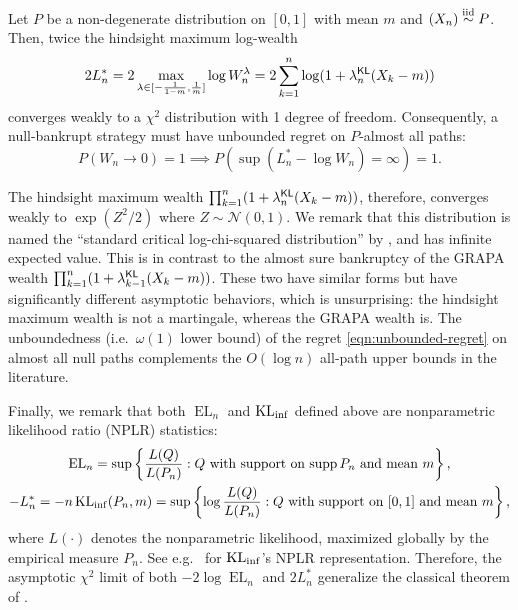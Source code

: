 \begin{theorem}\label{thm:chisq-klinf}  Let $P$ be a non-degenerate distribution on $[0,1]$ with mean $m$ and $(X_n)\overset{\mathrm{iid}}{\sim} P$. Then, twice the hindsight maximum log-wealth
    \begin{equation}
  2  L^*_n =  2\max_{\lambda \in [-\frac{1}{1-m}, \frac{1}{m}]} \log W_n^\lambda = 2\sum_{k=1}^n \log(1 + \lambda^{\mathsf{KL}}_n (X_k - m) )
    \end{equation}
    converges weakly to a $\chi^2$ distribution with 1 degree of freedom. 
    Consequently, a null-bankrupt strategy must have unbounded regret on $P$-almost all paths:
    \begin{equation}\label{eqn:unbounded-regret}
        P(W_n \to 0)=1 \implies P( \sup(L_n^* - \log W_n)=\infty) = 1.
    \end{equation}
\end{theorem}

The hindsight maximum wealth $\prod_{k=1}^n (1 + \lambda^{\mathsf{KL}}_n (X_k - m) )$, therefore, converges weakly to $\exp(Z^2/2)$ where $Z \sim \mathcal{N}(0,1)$. We remark that this distribution is named the ``standard critical log-chi-squared distribution'' by \citet[Proposition 5.7]{Wang2025ensm}, and has infinite expected value.
This is in contrast to the almost sure bankruptcy of the GRAPA wealth $\prod_{k=1}^n (1 + \lambda^{\mathsf{KL}}_{k-1} (X_k - m) )$. These two have similar forms but have significantly different asymptotic behaviors, which is unsurprising: the hindsight maximum wealth is not a martingale, whereas the GRAPA wealth is. The unboundedness (i.e.\ $\omega(1)$ lower bound) of the regret \eqref{eqn:unbounded-regret} on almost all null paths complements the $O(\log n)$ all-path upper bounds in the literature.


Finally, we remark that both $\operatorname{EL}_n$ and $\operatorname{KL}_{\inf}$ defined above are nonparametric likelihood ratio (NPLR) statistics:
\begin{gather}
    \operatorname{EL}_n = \sup \left\{ \frac{L(Q)}{L(P_n)} : \text{$Q$ with support on $\operatorname{supp}P_n$ and mean $m$} \right\},
    \\
 {-L_n^*}= {- n \operatorname{KL}_{\inf}(P_n, m)} = \sup  \left\{ \log \frac{L(Q)}{L(P_n)} : \text{$Q$ with support on $[0,1]$ and mean $m$} \right\},
\end{gather}
where $L(\cdot)$ denotes the nonparametric likelihood, maximized globally by the empirical measure $P_n$. See e.g.\ \cite{gaffke2005three} for $\operatorname{KL}_{\inf}$'s NPLR representation. Therefore, the asymptotic $\chi^2$ limit of both $-2\log \operatorname{EL}_n$ and $2L_n^*$ generalize the classical theorem of \cite{wilks1938large}.

